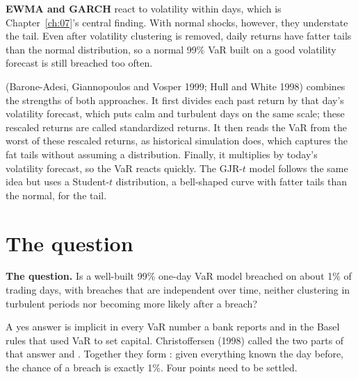 \textbf{EWMA and GARCH} react to volatility within days, which is Chapter~\ref{ch:07}'s central finding. With normal shocks, however, they understate the tail. Even after volatility clustering is removed, daily returns have fatter tails than the normal distribution, so a normal 99\% VaR built on a good volatility forecast is still breached too often.

 (Barone-Adesi, Giannopoulos and Vosper 1999; Hull and White 1998) combines the strengths of both approaches. It first divides each past return by that day's volatility forecast, which puts calm and turbulent days on the same scale; these rescaled returns are called standardized returns. It then reads the VaR from the worst of these rescaled returns, as historical simulation does, which captures the fat tails without assuming a distribution. Finally, it multiplies by today's volatility forecast, so the VaR reacts quickly. The GJR-$t$ model follows the same idea but uses a Student-$t$ distribution, a bell-shaped curve with fatter tails than the normal, for the tail.


\section{The question}
\label{sec:11-claim}

\begin{callout}
\textbf{The question.} Is a well-built 99\% one-day VaR model breached on about 1\% of trading days, with breaches that are independent over time, neither clustering in turbulent periods nor becoming more likely after a breach?
\end{callout}

A yes answer is implicit in every VaR number a bank reports and in the Basel rules that used VaR to set capital. Christoffersen (1998) called the two parts of that answer  and . Together they form : given everything known the day before, the chance of a breach is exactly 1\%. Four points need to be settled.

